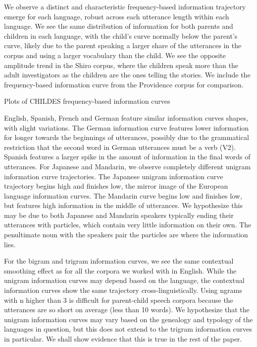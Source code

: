 \documentclass[11pt,]{article}
\begin{document}
We observe a distinct and characteristic frequency-based information trajectory emerge for each language, robust across each utterance length within each language. We see the same distribution of information for both parents and children in each language, with the child's curve normally below the parent's curve, likely due to the parent speaking a larger share of the utterances in the corpus and using a larger vocabulary than the child. We see the opposite amplitude trend in the Shiro corpus, where the children speak more than the adult investigators as the children are the ones telling the stories. We include the frequency-based information curve from the Providence corpus for comparison.

Plots of CHILDES frequency-based information curves

English, Spanish, French and German feature similar information curves shapes, with slight variations. The German information curve features lower information for longer towards the beginnings of utterances, possibly due to the grammatical restriction that the second word in German utterances must be a verb (V2). Spanish features a larger spike in the amount of information in the final words of utterances. For Japanese and Mandarin, we observe completely different unigram information curve trajectories. The Japanese unigram information curve trajectory begins high and finishes low, the mirror image of the European language information curves. The Mandarin curve begins low and finishes low, but features high information in the middle of utterances. We hypothesize this may be due to both Japanese and Mandarin speakers typically ending their utterances with particles, which contain very little information on their own. The penultimate noun with the speakers pair the particles are where the information lies.

For the bigram and trigram information curves, we see the same contextual smoothing effect as for all the corpora we worked with in English. While the unigram information curves may depend based on the language, the contextual information curves show the same trajectory cross-linguistically. Using ngrams with n higher than 3 is difficult for parent-child speech corpora because the utterances are so short on average (less than 10 words). We hypothesize that the unigram information curves may vary based on the genealogy and typology of the languages in question, but this does not extend to the trigram information curves in particular. We shall show evidence that this is true in the rest of the paper.
\end{document}
